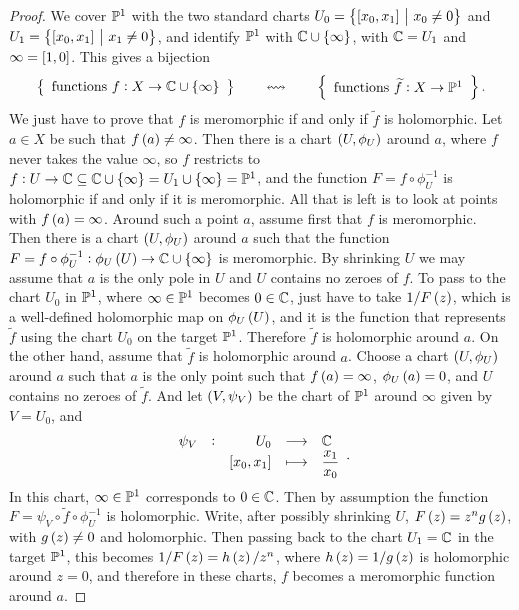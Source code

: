 \begin{proof}
We cover $ \mathbb{P}^1 $ with the two standard charts $ U_0 = \cbr{\sbr{x_0, x_1} \st x_0 \ne 0} $ and $ U_1 = \cbr{\sbr{x_0, x_1} \st x_1 \ne 0} $, and identify $ \mathbb{P}^1 $ with $ \CC \cup \cbr{\infty} $, with $ \mathbb{C} = U_1 $ and $ \infty = \sbr{1, 0} $. This gives a bijection
$$ \correspondence{\text{functions} \ f : X \to \CC \cup \cbr{\infty}}{\text{functions} \ \widetilde{f} : X \to \PP^1}. $$
We just have to prove that $ f $ is meromorphic if and only if $ \widetilde{f} $ is holomorphic. Let $ a \in X $ be such that $ f\br{a} \ne \infty $. Then there is a chart $ \br{U, \phi_U} $ around $ a $, where $ f $ never takes the value $ \infty $, so $ f $ restricts to $ f : U \to \CC \subseteq \CC \cup \cbr{\infty} = U_1 \cup \cbr{\infty} = \PP^1 $, and the function $ F = f \circ \phi_U^{-1} $ is holomorphic if and only if it is meromorphic. All that is left is to look at points with $ f\br{a} = \infty $. Around such a point $ a $, assume first that $ f $ is meromorphic. Then there is a chart $ \br{U, \phi_U} $ around $ a $ such that the function $ F = f \circ \phi_U^{-1} : \phi_U\br{U} \to \CC \cup \cbr{\infty} $ is meromorphic. By shrinking $ U $ we may assume that $ a $ is the only pole in $ U $ and $ U $ contains no zeroes of $ f $. To pass to the chart $ U_0 $ in $ \mathbb{P}^1 $, where $ \infty \in \mathbb{P}^1 $ becomes $ 0 \in \mathbb{C} $, just have to take $ 1 / F\br{z} $, which is a well-defined holomorphic map on $ \phi_U\br{U} $, and it is the function that represents $ \widetilde{f} $ using the chart $ U_0 $ on the target $ \mathbb{P}^1 $. Therefore $ \widetilde{f} $ is holomorphic around $ a $. On the other hand, assume that $ \widetilde{f} $ is holomorphic around $ a $. Choose a chart $ \br{U, \phi_U} $ around $ a $ such that $ a $ is the only point such that $ f\br{a} = \infty $, $ \phi_U\br{a} = 0 $, and $ U $ contains no zeroes of $ \widetilde{f} $. And let $ \br{V, \psi_V} $ be the chart of $ \mathbb{P}^1 $ around $ \infty $ given by $ V = U_0 $, and
$$ \function[\psi_V]{U_0}{\CC}{\sbr{x_0, x_1}}{\dfrac{x_1}{x_0}}. $$
In this chart, $ \infty \in \mathbb{P}^1 $ corresponds to $ 0 \in \mathbb{C} $. Then by assumption the function $ F = \psi_V \circ \widetilde{f} \circ \phi_U^{-1} $ is holomorphic. Write, after possibly shrinking $ U $, $ F\br{z} = z^ng\br{z} $, with $ g\br{z} \ne 0 $ and holomorphic. Then passing back to the chart $ U_1 = \mathbb{C} $ in the target $ \mathbb{P}^1 $, this becomes $ 1 / F\br{z}  = h\br{z} / z^n $, where $ h\br{z} = 1 / g\br{z} $ is holomorphic around $ z = 0 $, and therefore in these charts, $ f $ becomes a meromorphic function around $ a $.
\end{proof}

